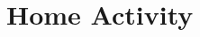 \section{Home Activity}

\begin{lstlisting}[style=sourceCode, language=JAVA, caption=This is code, label=lst:homeActivity] 

\end{lstlisting}